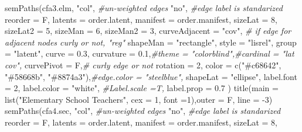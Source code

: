 \documentclass[
]{article}
\newenvironment{Shaded}{\begin{snugshade}}{\end{snugshade}}
\newcommand{\AttributeTok}[1]{\textcolor[rgb]{0.77,0.63,0.00}{#1}}
\newcommand{\CommentTok}[1]{\textcolor[rgb]{0.56,0.35,0.01}{\textit{#1}}}
\newcommand{\DecValTok}[1]{\textcolor[rgb]{0.00,0.00,0.81}{#1}}
\newcommand{\FloatTok}[1]{\textcolor[rgb]{0.00,0.00,0.81}{#1}}
\newcommand{\FunctionTok}[1]{\textcolor[rgb]{0.00,0.00,0.00}{#1}}
\newcommand{\NormalTok}[1]{#1}
\newcommand{\SpecialCharTok}[1]{\textcolor[rgb]{0.00,0.00,0.00}{#1}}
\newcommand{\StringTok}[1]{\textcolor[rgb]{0.31,0.60,0.02}{#1}}
\begin{document}
\begin{Shaded}
\begin{Highlighting}[]
\FunctionTok{semPaths}\NormalTok{(cfa3.elm, }
         \StringTok{"col"}\NormalTok{, }\CommentTok{\#un{-}weighted edges}
         \StringTok{"no"}\NormalTok{, }\CommentTok{\#edge label is standarized}
         \AttributeTok{reorder =}\NormalTok{ F,}
         \AttributeTok{latents =}\NormalTok{ order.latent,}
         \AttributeTok{manifest =}\NormalTok{ order.manifest,}
         \AttributeTok{sizeLat =} \DecValTok{8}\NormalTok{,}
         \AttributeTok{sizeLat2 =} \DecValTok{5}\NormalTok{,}
         \AttributeTok{sizeMan =} \DecValTok{6}\NormalTok{,}
         \AttributeTok{sizeMan2 =} \DecValTok{3}\NormalTok{,}
         \AttributeTok{curveAdjacent =} \StringTok{"cov"}\NormalTok{, }\CommentTok{\# if edge for adjacent nodes curly or not, "reg"}
         \AttributeTok{shapeMan =} \StringTok{"rectangle"}\NormalTok{,}
         \AttributeTok{style =} \StringTok{"lisrel"}\NormalTok{,}
         \AttributeTok{group =} \StringTok{"latent"}\NormalTok{,}
         \AttributeTok{curve =} \FloatTok{0.3}\NormalTok{,}
         \AttributeTok{curvature =} \FloatTok{0.1}\NormalTok{,}\CommentTok{\#theme = "colorblind",\#cardinal = "lat cov",}
         \AttributeTok{curvePivot =}\NormalTok{ F,}\CommentTok{\# curly edge or not}
         \AttributeTok{rotation =} \DecValTok{2}\NormalTok{,}
         \AttributeTok{color =} \FunctionTok{c}\NormalTok{(}\StringTok{"\#c68642"}\NormalTok{, }\StringTok{"\#58668b"}\NormalTok{, }\StringTok{"\#8874a3"}\NormalTok{),}\CommentTok{\#edge.color = "steelblue",}
         \AttributeTok{shapeLat =} \StringTok{"ellipse"}\NormalTok{,}
         \AttributeTok{label.font =} \DecValTok{2}\NormalTok{,}
         \AttributeTok{label.color =} \StringTok{"white"}\NormalTok{, }\CommentTok{\#Label.scale =T,}
         \AttributeTok{label.prop =} \FloatTok{0.7}
\NormalTok{         )}
\FunctionTok{title}\NormalTok{(}\AttributeTok{main =} \FunctionTok{list}\NormalTok{(}\StringTok{"Elementary School Teachers"}\NormalTok{,}
                  \AttributeTok{cex =} \DecValTok{1}\NormalTok{, }\AttributeTok{font =}\DecValTok{1}\NormalTok{),}\AttributeTok{outer =}\NormalTok{ F, }\AttributeTok{line =} \SpecialCharTok{{-}}\DecValTok{3}\NormalTok{)}
\FunctionTok{semPaths}\NormalTok{(cfa4.sec, }
         \StringTok{"col"}\NormalTok{, }\CommentTok{\#un{-}weighted edges}
         \StringTok{"no"}\NormalTok{, }\CommentTok{\#edge label is standarized}
         \AttributeTok{reorder =}\NormalTok{ F,}
         \AttributeTok{latents =}\NormalTok{ order.latent,}
         \AttributeTok{manifest =}\NormalTok{ order.manifest,}
         \AttributeTok{sizeLat =} \DecValTok{8}\NormalTok{,}

\end{Highlighting}
\end{Shaded}
\end{document}
